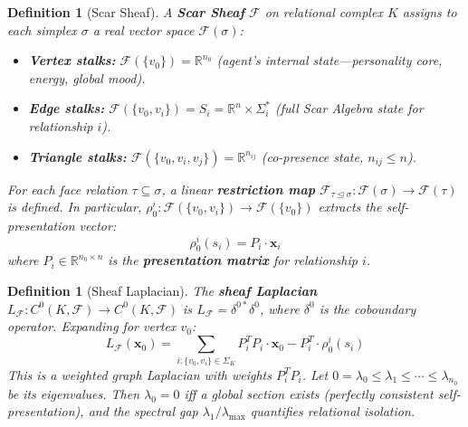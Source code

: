 \documentclass[11pt]{article}
\newtheorem{definition}[theorem]{Definition}
\begin{document}
\begin{definition}[Scar Sheaf]
\label{def:scar-sheaf}
A \textbf{Scar Sheaf} $\mathcal{F}$ on relational complex $K$ assigns to each simplex $\sigma$ a real vector space $\mathcal{F}(\sigma)$:
\begin{itemize}
\item \textbf{Vertex stalks:} $\mathcal{F}(\{v_0\}) = \mathbb{R}^{n_0}$ (agent's internal state---personality core, energy, global mood).
\item \textbf{Edge stalks:} $\mathcal{F}(\{v_0, v_i\}) = S_i = \mathbb{R}^n \times \Sigma_i^*$ (full Scar Algebra state for relationship $i$).
\item \textbf{Triangle stalks:} $\mathcal{F}(\{v_0, v_i, v_j\}) = \mathbb{R}^{n_{ij}}$ (co-presence state, $n_{ij} \leq n$).
\end{itemize}
For each face relation $\tau \subseteq \sigma$, a linear \textbf{restriction map} $\mathcal{F}_{\tau \trianglelefteq \sigma}: \mathcal{F}(\sigma) \to \mathcal{F}(\tau)$ is defined. In particular, $\rho_0^i: \mathcal{F}(\{v_0, v_i\}) \to \mathcal{F}(\{v_0\})$ extracts the self-presentation vector:
\begin{equation}
\rho_0^i(s_i) = P_i \cdot \mathbf{x}_i
\end{equation}
where $P_i \in \mathbb{R}^{n_0 \times n}$ is the \textbf{presentation matrix} for relationship $i$.
\end{definition}

\begin{definition}[Sheaf Laplacian]
\label{def:sheaf-laplacian}
The \textbf{sheaf Laplacian} $L_\mathcal{F}: C^0(K, \mathcal{F}) \to C^0(K, \mathcal{F})$ is $L_\mathcal{F} = \delta^{0*}\delta^0$, where $\delta^0$ is the coboundary operator. Expanding for vertex $v_0$:
\begin{equation}
L_\mathcal{F}(\mathbf{x}_0) = \sum_{i: \{v_0, v_i\} \in \Sigma_K} P_i^T P_i \cdot \mathbf{x}_0 - P_i^T \cdot \rho_0^i(s_i)
\end{equation}
This is a weighted graph Laplacian with weights $P_i^T P_i$. Let $0 = \lambda_0 \leq \lambda_1 \leq \cdots \leq \lambda_{n_0}$ be its eigenvalues. Then $\lambda_0 = 0$ iff a global section exists (perfectly consistent self-presentation), and the spectral gap $\lambda_1/\lambda_{\max}$ quantifies relational isolation.
\end{definition}
\end{document}
